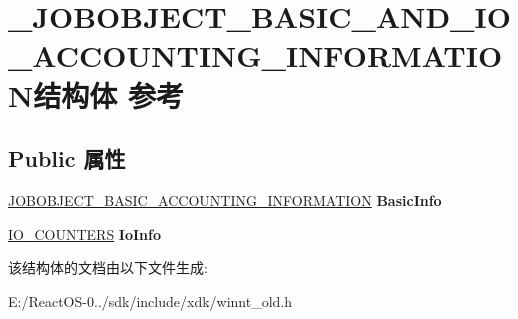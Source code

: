\hypertarget{struct___j_o_b_o_b_j_e_c_t___b_a_s_i_c___a_n_d___i_o___a_c_c_o_u_n_t_i_n_g___i_n_f_o_r_m_a_t_i_o_n}{}\section{\+\_\+\+J\+O\+B\+O\+B\+J\+E\+C\+T\+\_\+\+B\+A\+S\+I\+C\+\_\+\+A\+N\+D\+\_\+\+I\+O\+\_\+\+A\+C\+C\+O\+U\+N\+T\+I\+N\+G\+\_\+\+I\+N\+F\+O\+R\+M\+A\+T\+I\+O\+N结构体 参考}
\label{struct___j_o_b_o_b_j_e_c_t___b_a_s_i_c___a_n_d___i_o___a_c_c_o_u_n_t_i_n_g___i_n_f_o_r_m_a_t_i_o_n}
\subsection*{Public 属性}
\begin{DoxyCompactItemize}
\item 
\mbox{\label{struct___j_o_b_o_b_j_e_c_t___b_a_s_i_c___a_n_d___i_o___a_c_c_o_u_n_t_i_n_g___i_n_f_o_r_m_a_t_i_o_n_a939d601ca014a5a66068c3208dc77267}} 
\hyperlink{struct___j_o_b_o_b_j_e_c_t___b_a_s_i_c___a_c_c_o_u_n_t_i_n_g___i_n_f_o_r_m_a_t_i_o_n}{J\+O\+B\+O\+B\+J\+E\+C\+T\+\_\+\+B\+A\+S\+I\+C\+\_\+\+A\+C\+C\+O\+U\+N\+T\+I\+N\+G\+\_\+\+I\+N\+F\+O\+R\+M\+A\+T\+I\+ON} {\bfseries Basic\+Info}
\item 
\mbox{\label{struct___j_o_b_o_b_j_e_c_t___b_a_s_i_c___a_n_d___i_o___a_c_c_o_u_n_t_i_n_g___i_n_f_o_r_m_a_t_i_o_n_ad76c53a067a60149e133e6f2e6ec34e0}} 
\hyperlink{struct___i_o___c_o_u_n_t_e_r_s}{I\+O\+\_\+\+C\+O\+U\+N\+T\+E\+RS} {\bfseries Io\+Info}
\end{DoxyCompactItemize}


该结构体的文档由以下文件生成\+:\begin{DoxyCompactItemize}
\item 
E\+:/\+React\+O\+S-\/0../sdk/include/xdk/winnt\+\_\+old.\+h\end{DoxyCompactItemize}

